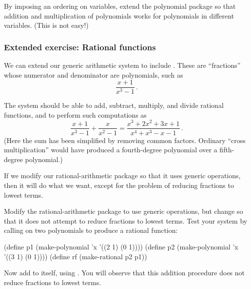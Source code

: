 \begin{exercise}
	\label{Exercise 2.92}
	By imposing an ordering on variables, extend the polynomial package so that addition and multiplication of polynomials works for polynomials in different variables.
	(This is not easy!)
\end{exercise}



\subsubsection*{Extended exercise: Rational functions}

We can extend our generic arithmetic system to include .
These are “fractions” whose numerator and denominator are polynomials, such as
\[
	\frac{x + 1}{x^3 - 1} \,.
\]

The system should be able to add, subtract, multiply, and divide rational
functions, and to perform such computations as
\[
	\frac{x + 1}{x^3 - 1} + \frac{x}{x^2 - 1}
	=
	\frac{x^3 + 2 x^2 + 3 x + 1}{x^4 + x^3 - x - 1} \,.
\]
(Here the sum has been simplified by removing common factors.
Ordinary “cross multiplication” would have produced a fourth-degree polynomial over a fifth-degree polynomial.)

If we modify our rational-arithmetic package so that it uses generic operations, then it will do what we want, except for the problem of reducing fractions to lowest terms.



\begin{exercise}
	\label{Exercise 2.93}
	Modify the rational-arithmetic package to use generic operations, but change  so that it does not attempt to reduce fractions to lowest terms.
	Test your system by calling  on two polynomials to produce a rational function:
	\begin{scheme}
	  (define p1 (make-polynomial 'x '((2 1) (0 1))))
	  (define p2 (make-polynomial 'x '((3 1) (0 1))))
	  (define rf (make-rational p2 p1))
	\end{scheme}
	Now add  to itself, using .
	You will observe that this addition procedure does not reduce fractions to lowest terms.
\end{exercise}



